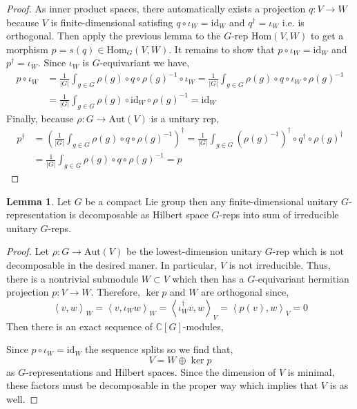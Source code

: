 \documentclass[12pt]{extarticle}
\newcommand{\id}{\mathrm{id}}
\newcommand{\Hom}[2]{\mathrm{Hom}\left( #1, #2 \right)}
\newcommand{\catHom}[3]{\mathrm{Hom}_{#1}\left( #2, #3 \right)}
\theoremstyle{definition}
\newtheorem{lemma}[theorem]{Lemma}
\newcommand{\Aut}[1]{\mathrm{Aut}\left(#1 \right)}
\newcommand{\C}{\mathbb{C}}
\newcommand{\inner}[2]{\left< #1, #2 \right>}
\begin{document}
\begin{proof}
As inner product spaces, there automatically exists a projection $q : V \to W$ because $V$ is finite-dimensional satisfing $q \circ \iota_W = \id_W$ and $q^\dagger = \iota_W$ i.e.  is orthogonal. Then apply the previous lemma to the $G$-rep $\Hom{V}{W}$ to get a morphism $p = s(q) \in \catHom{G}{V}{W}$. It remains to show that $p \circ \iota_W = \id_W$ and $p^\dagger = \iota_W$. Since $\iota_W$  is $G$-equivariant we have,
\begin{align*}
 p \circ \iota_W & = \frac{1}{|G|} \int_{g \in G} \rho(g) \circ q \circ \rho(g)^{-1} \circ \iota_W = \frac{1}{|G|} \int_{g \in G} \rho(g) \circ q  \circ \iota_W \circ \rho(g)^{-1}
\\
& = \frac{1}{|G|} \int_{g \in G} \rho(g) \circ \id_W \circ \rho(g)^{-1} = \id_W
\end{align*}
Finally, because $\rho : G \to \Aut{V}$ is a unitary rep,
\begin{align*}
p^\dagger & = \left( \frac{1}{|G|} \int_{g \in G} \rho(g) \circ q \circ \rho(g)^{-1} \right)^\dagger =  \frac{1}{|G|}  \int_{g \in G} (\rho(g)^{-1})^{\dagger} \circ q^\dagger \circ \rho(g)^\dagger
\\
& = \frac{1}{|G|} \int_{g \in G} \rho(g) \circ q \circ \rho(g)^{-1} = p
\end{align*}
\end{proof}

\begin{lemma}
Let $G$ be a compact Lie group then any finite-dimensional unitary $G$-representation is decomposable as Hilbert space $G$-reps into sum of irreducible unitary $G$-reps.
\end{lemma}

\begin{proof}
Let $\rho : G \to \Aut{V}$ be the lowest-dimension unitary $G$-rep which is not decomposable in the desired maner. In particular, $V$ is not irreducible. Thus, there is a nontrivial submodule $W \subset V$ which then has a $G$-equivariant hermitian projection $p : V \to W$. Therefore, $\ker{p}$ and $W$ are orthogonal since,
\[ \inner{v}{w}_W = \inner{v}{\iota_W w}_W = \inner{\iota_W^\dagger v}{w}_V = \inner{p(v)}{w}_V = 0 \]
Then there is an exact sequence of $\C[G]$-modules,
\begin{center}
\end{center}
Since $p \circ \iota_W = \id_W$ the sequence splits so we find that,
\[ V = W \oplus \ker{p} \]
as $G$-representations and Hilbert spaces. Since the dimension of $V$ is minimal, these factors must be decomposable in the proper way which implies that $V$ is as well.
\end{proof}
\end{document}
